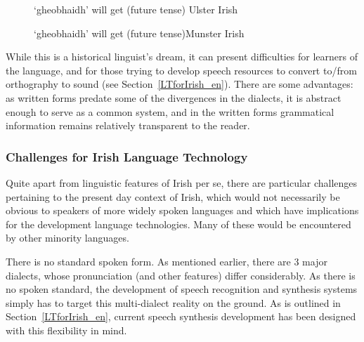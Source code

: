 \begin{multicols}{2}

\begin{description}
\item [{\rm \begin{IPA}j\super jo: i\end{IPA}}]  `gheobhaidh’  will get (future tense) \newline Ulster Irish
\item [{\rm \begin{IPA}g\super jo: g\super j\end{IPA}} ]  `gheobhaidh’  will get (future tense)\newline Munster Irish
\end{description}

While this is a historical linguist's dream, it can present difficulties for learners of the language, and for those trying to develop speech resources to convert to/from orthography to sound (see Section~\ref{LTforIrish_en}).  There are some advantages: as written forms predate some of the divergences in the dialects, it is abstract enough to serve as a common system, and in the written forms grammatical information remains relatively transparent to the reader.

\subsubsection {Challenges for Irish Language Technology}

Quite apart from linguistic features of Irish per se, there are particular challenges pertaining to the present day context of Irish, which would not necessarily be obvious to speakers of more widely spoken languages and which have implications for the development language technologies. Many of these would be encountered by other minority languages.

There is no standard spoken form. As mentioned earlier, there are 3 major dialects, whose pronunciation (and other features) differ considerably. As there is no spoken standard, the development of speech recognition and synthesis systems simply has to target this multi-dialect reality on the ground. As is outlined in Section~\ref{LTforIrish_en}, current speech synthesis development has been designed with this flexibility in mind.


\end{multicols}
